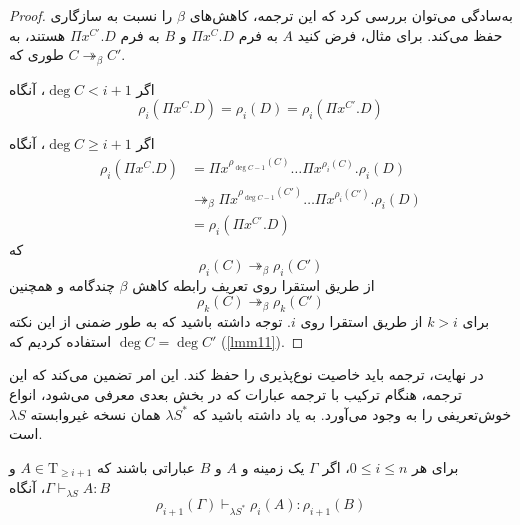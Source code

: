 \begin{proof}
به‌سادگی می‌توان بررسی کرد که این ترجمه، کاهش‌های
$\beta$
را نسبت به سازگاری حفظ می‌کند. برای مثال، فرض کنید
$A$
به فرم
$\Pi x^C.D$
و
$B$
به فرم
$\Pi x^{C'}.D$
هستند، به طوری که
$C \twoheadrightarrow_{\beta} C'$.

اگر
$\operatorname{deg} C < i + 1$،
آنگاه
\begin{equation*}
\rho_i(\Pi x^C.D) = \rho_i(D) = \rho_i(\Pi x^{C'}.D)
\end{equation*}

اگر
$\operatorname{deg} C \ge i + 1$،
آنگاه
\begin{align*}
\rho_i(\Pi x^C.D) 
&= \Pi x^{\rho_{\operatorname{deg} C - 1}(C)} \dots \Pi x^{\rho_{i}(C)}.\rho_i(D) \\
&\twoheadrightarrow_{\beta} \Pi x^{\rho_{\operatorname{deg} C - 1}(C')} \dots \Pi x^{\rho_{i}(C')}.\rho_i(D) \\
&=\rho_i(\Pi x^{C'}.D)
\end{align*}
که
\begin{equation*}
\rho_i(C) \twoheadrightarrow_{\beta} \rho_i(C')
\end{equation*}
از طریق استقرا روی تعریف رابطه کاهش
$\beta$
چندگامه و همچنین
\begin{equation*}
\rho_k(C) \twoheadrightarrow_{\beta} \rho_k(C')
\end{equation*}
برای
$k > i$
از طریق استقرا روی
$i$.
توجه داشته باشید که به طور ضمنی از این نکته استفاده کردیم که
$\operatorname{deg} C = \operatorname{deg} C'$ (\ref{lmm11}).

\end{proof}

در نهایت، ترجمه باید خاصیت نوع‌پذیری را حفظ کند. این امر تضمین می‌کند که این ترجمه، هنگام ترکیب با ترجمه‌ عبارات که در بخش بعدی معرفی می‌شود، انواع خوش‌تعریفی را به وجود می‌آورد. به یاد داشته باشید که
$\lambda S^*$
همان نسخه غیروابسته
$\lambda S$
است.

\begin{lmm}\label{rho_commutes_typing}
برای هر
$0 \le i \le n$،
اگر
$\Gamma$ یک زمینه و
$A$ و $B$ عباراتی باشند که
$A \in \mathrm{T}_{\ge i+1}$ و $\Gamma \vdash_{\lambda S} A : B$، آنگاه
\begin{equation*}
\rho_{i+1}(\Gamma) \vdash_{\lambda S^*} \rho_i(A) : \rho_{i+1}(B)
\end{equation*}
\end{lmm}

